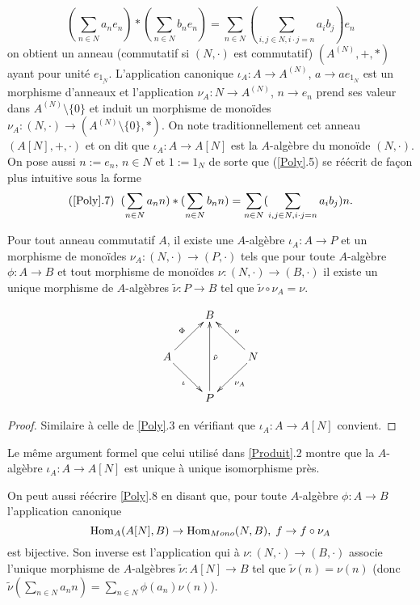 	\begin{equation}(\sum_{n\in N}a_{n}e_{n}) *(\sum_{n\in N}b_{n}e_{n})=\sum_{n\in N}(\sum_{i,j\in N,i\cdot j=n}a_{i}b_{j})e_{n}\end{equation}
on obtient un anneau (commutatif si $(N,\cdot)$ est commutatif) $(A^{(N)},+,*)$  ayant pour unité $e_{\underline{1_N}}$. L'application canonique $\iota_A:A\rightarrow A^{(N)}$, $a\rightarrow ae_{1_N}  $  est un morphisme d'anneaux et l'application $\nu_A:N\rightarrow A^{(N)}$, $n\rightarrow e_n$ prend ses valeur dans $A^{(N)}\setminus\lbrace 0\rbrace$ et induit un morphisme de monoïdes $\nu_A:(N,\cdot)\rightarrow (A^{(N)}\setminus\lbrace 0\rbrace,*)$.
 On note traditionnellement cet anneau $(A[N],+,\cdot) $ et on dit que $\iota_A:A\rightarrow A[N]$ est la $A$-algèbre du monoïde $(N,\cdot)$. On pose aussi $n:=e_{n}$, $n\in N$    et $1:=1_N$ de sorte que (\ref{Poly}.5) se réécrit de façon plus intuitive sous la forme
 $$(\ref{Poly}.7)\;\; (\sum_{n\in N}a_{n}n) *(\sum_{n\in N}b_{n}n)=\sum_{n\in N}(\sum_{i,j\in N,i\cdot j=n}a_{i}b_{j})n.$$

 \begin{lemme}Pour tout anneau commutatif $A$, il existe une $A$-algèbre $\iota_A: A\rightarrow P$ et un  morphisme de monoïdes $\nu_A:(N,\cdot)\rightarrow (P  ,\cdot)$ tels que pour toute $A$-algèbre   $\phi: A\rightarrow B$ et tout morphisme de monoïdes $\nu:(N,\cdot)\rightarrow (B  ,\cdot)$  il existe un unique  morphisme de $A$-algèbres $\tilde{\nu}:P\rightarrow B$  tel que $ \tilde{\nu}\circ \nu_A=\nu$.\end{lemme}

	$$ \xymatrix{ & B \\ A \ar[ru]^\Phi \ar[rd]_\iota & & N \ar[lu]_\nu \ar[ld]^{\nu_A} \\ & P \ar[uu]_{\tilde{\nu} } } $$

\begin{proof} Similaire à celle de \ref{Poly}.3 en vérifiant que $\iota_A:A\rightarrow A[N]$ convient. \end{proof}

  Le même argument  formel que celui utilisé dans \ref{Produit}.2 montre que la $A$-algèbre $\iota_A: A\rightarrow A[N]$ est unique à unique isomorphisme  près.\\

\begin{remarque}On peut aussi réécrire \ref{Poly}.8 en disant que, pour toute $A$-algèbre $\phi:A\rightarrow B$  l'application canonique
$$\operatorname{Hom}_A(A[N],B)\rightarrow\operatorname{Hom}_{Mono}(N,B),\; f\rightarrow f\circ\nu_A$$
est bijective. Son inverse est l'application qui à $\nu:(N,\cdot)\rightarrow (B,\cdot) $ associe l'unique morphisme de $A$-algèbres $ \tilde{\nu}:A[N]\rightarrow B$ tel que $ \tilde{\nu}(n)=\nu(n)$ (donc $\tilde{\nu}(\sum_{n\in N}a_nn)=\sum_{n\in N}\phi(a_n)\nu(n)$).\end{remarque}

